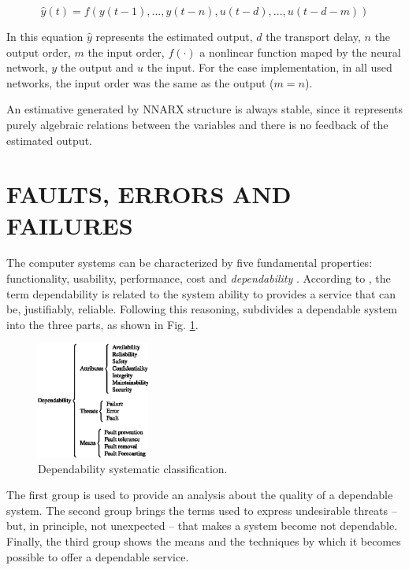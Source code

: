 \documentclass[10pt,fleqn,a4paper]{article}
\newcommand{\parent}[1]{\left(#1\right)}
\begin{document}
\begin{equation}
\label{eq:nnarx}
\hat{y}(t) = f\parent{y(t-1), \ldots, y(t-n), u(t-d), \ldots, u(t-d-m)}
\end{equation}

In this equation $\hat{y}$ represents the estimated output, $d$ the transport
delay, $n$ the output order, $m$ the input order, $f(\cdotp)$ a nonlinear
function maped by the neural network, $y$ the output and $u$ the input. For the
ease implementation, in all used networks, the input order was the same as the
output ($m = n$).

An estimative generated by NNARX structure is always stable, since it represents
purely algebraic relations between the variables and there is no feedback of the
estimated output.

\section{FAULTS, ERRORS AND FAILURES}\label{sec:eff}
The computer systems can be characterized by five fundamental properties:
functionality, usability, performance, cost and {\it dependability}
\citep{kaaniche:2002}. According to \citet{laprie:1992}, the term dependability
is related to the system ability to provides a service that can be, justifiably,
reliable. Following this reasoning, \citet{avizienis:2000} subdivides a
dependable system into the three parts, as shown in Fig.
\ref{fig:div_avizienis}.

\begin{figure}[htb]
\centering
    \includegraphics[width=0.33\textwidth]{imgs/div_avizienis}
    \caption{Dependability systematic classification.}
    \label{fig:div_avizienis}
\end{figure}

The first group is used to provide an analysis about the quality of a dependable
system. The second group brings the terms used to express undesirable threats --
but, in principle, not unexpected -- that makes a system become not dependable.
Finally, the third group shows the means and the techniques by which it becomes
possible to offer a dependable service.
\end{document}
